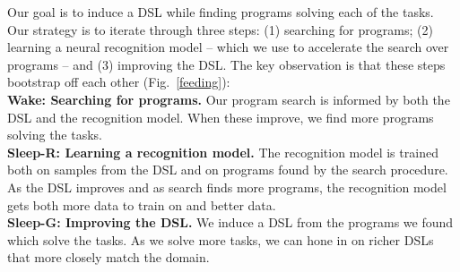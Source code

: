 \documentclass{article}
\newcommand{\system}{\textsc{DreamCoder}~}
\begin{document}
Our goal  is to induce a DSL while finding programs solving each of the tasks.
Our strategy is to iterate through three steps: (1) searching for programs; (2) learning a neural recognition model -- which we use
to accelerate the search over programs -- and (3) improving the DSL.
The key observation is that these steps bootstrap off each other (Fig.~\ref{feeding}):
\\\noindent \textbf{Wake: Searching for programs.}  Our program search  is informed by both the DSL and the recognition model.
When these improve, we find more programs solving the tasks.
\\\noindent\textbf{Sleep-R: Learning a recognition model.} The recognition model is trained both on samples from the DSL and on programs found by the search procedure. As the DSL improves and as search finds more programs, the recognition model gets both more data to train on and better data.
\\\noindent\textbf{Sleep-G: Improving the DSL.} We induce a DSL from the programs we found which solve the tasks.
  As we solve more tasks, we can hone in on richer DSLs that more closely match the domain.

\end{document}
